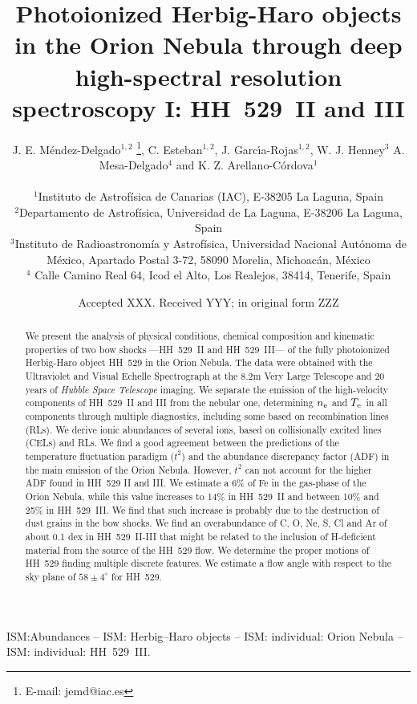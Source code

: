\documentclass[fleqn,usenatbib]{mnras}
\title[HH~529~II and III in the Orion Nebula]{Photoionized Herbig-Haro objects in the Orion Nebula through deep high-spectral resolution spectroscopy I: HH~529~II and III}
\author[J. E. M\'endez-Delgado et al.]
{J. E. M\'endez-Delgado$^{1,2}$ \thanks{E-mail: jemd@iac.es},
C. Esteban$^{1,2}$, J. Garc{\'{\i}}a-Rojas$^{1,2}$, W. J. Henney$^{3}$  
\newauthor 
A. Mesa-Delgado$^{4}$ and K. Z. Arellano-C\'ordova$^{1}$\\
\\
$^{1}$Instituto de Astrof\'isica de Canarias (IAC), E-38205 La Laguna, Spain\\
$^{2}$Departamento de Astrof\'isica, Universidad de La Laguna, E-38206 La Laguna, Spain\\
$^{3}$Instituto de Radioastronom\'ia y Astrof\'isica, Universidad Nacional Aut\'onoma de M\'exico, Apartado Postal 3-72, 58090 Morelia, Michoac\'an, M\'exico\\
$^{4}$ Calle Camino Real 64, Icod el Alto, Los Realejos, 38414, Tenerife, Spain}
\date{Accepted XXX. Received YYY; in original form ZZZ}
\begin{document}
\label{firstpage}
\pagerange{\pageref{firstpage}--\pageref{lastpage}}
\maketitle

\begin{abstract}


We present the analysis of physical conditions, chemical composition and kinematic properties of two bow shocks ---HH~529~II and HH~529~III--- of the fully photoionized Herbig-Haro object HH~529 in the Orion Nebula. The data  were obtained with the Ultraviolet and Visual Echelle Spectrograph at the 8.2m Very Large Telescope and 20 years of \textit{Hubble Space Telescope} imaging. We separate the  emission of the high-velocity components of HH~529~II and III from the nebular one, determining $n_{\rm e}$ and $T_{\rm e}$ in all components through multiple diagnostics, including some based on recombination lines (RLs). We derive ionic abundances of several ions, based on collisionally excited lines (CELs) and RLs. We find a good agreement between the predictions of the temperature fluctuation paradigm ($t^2$) and the abundance discrepancy factor (ADF) in the main emission of the Orion Nebula. However, $t^2$ can not account for the higher ADF found in HH~529 II and III. We estimate a 6\%  of Fe in the gas-phase of the Orion Nebula, while this value increases to 14\% in HH~529~II and between 10\% and 25\% in HH~529~III. We find that such increase is probably due to the destruction of dust grains in the bow shocks. We find an overabundance of C, O, Ne, S, Cl and Ar of about 0.1 dex in HH~529~II-III that might be related to the inclusion of H-deficient material from the source of the HH~529 flow. We determine the proper motions of HH~529 finding multiple discrete features. We estimate a flow angle with respect to the sky plane of $58 \pm 4^{\circ}$ for HH~529.



\end{abstract}

\begin{keywords}
ISM:Abundances – ISM: Herbig–Haro objects – ISM: individual:
Orion Nebula – ISM: individual: HH~529~III.
\end{keywords}

\end{document}
